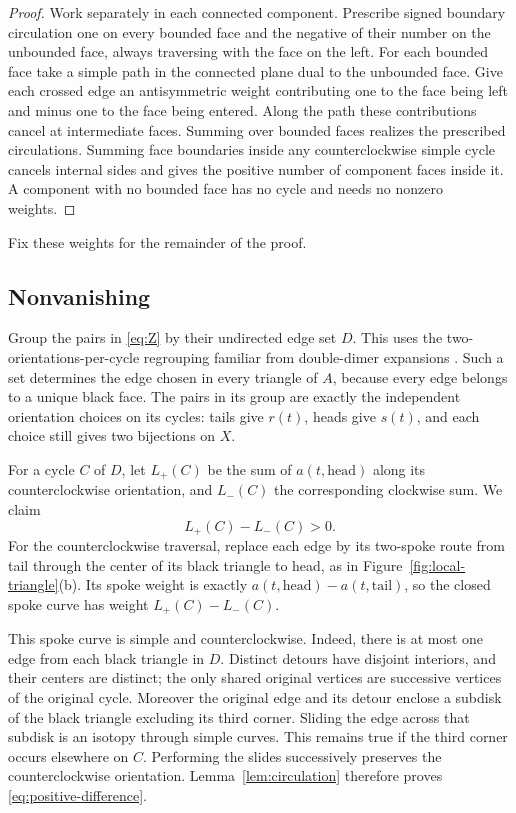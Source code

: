 \documentclass[11pt]{article}
\theoremstyle{remark}
\numberwithin{equation}{section}
\begin{document}
\begin{proof}
Work separately in each connected component. Prescribe
signed boundary circulation one on every bounded face and
the negative of their number on the unbounded face, always
traversing with the face on the left. For each bounded face
take a simple path in the connected plane dual to the
unbounded face. Give each crossed edge an antisymmetric
weight contributing one to the face being left and minus
one to the face being entered. Along the path these
contributions cancel at intermediate faces. Summing over
bounded faces realizes the prescribed circulations.
Summing face boundaries inside any counterclockwise simple
cycle cancels internal sides and gives the positive number
of component faces inside it. A component with no bounded
face has no cycle and needs no nonzero weights.
\end{proof}

Fix these weights for the remainder of the proof.

\subsection{Nonvanishing}

Group the pairs in \eqref{eq:Z} by their undirected edge
set \(D\). This uses the two-orientations-per-cycle regrouping
familiar from double-dimer expansions
\cite[Section~3.2.1, Lemma~1]{Kenyon2014}. Such a set determines the edge chosen in every
triangle of \(A\), because every edge belongs to a unique
black face. The pairs in its group are exactly the
independent orientation choices on its cycles: tails
give \(r(t)\), heads give \(s(t)\), and each choice
still gives two bijections on \(X\).

For a cycle \(C\) of \(D\), let \(L_+(C)\) be the sum
of \(a(t,\mathrm{head})\) along its counterclockwise
orientation, and \(L_-(C)\) the corresponding clockwise
sum. We claim
\begin{equation}\label{eq:positive-difference}
 L_+(C)-L_-(C)>0.
\end{equation}
For the counterclockwise traversal, replace each edge
by its two-spoke route from tail through the center of
its black triangle to head, as in Figure~\ref{fig:local-triangle}(b).
Its spoke weight is exactly
\(a(t,\mathrm{head})-a(t,\mathrm{tail})\), so the
closed spoke curve has weight \(L_+(C)-L_-(C)\).

This spoke curve is simple and counterclockwise. Indeed,
there is at most one edge from each black triangle in
\(D\). Distinct detours have disjoint interiors, and
their centers are distinct; the only shared original
vertices are successive vertices of the original cycle.
Moreover the original edge and its detour enclose a
subdisk of the black triangle excluding its third
corner. Sliding the edge across that subdisk is an
isotopy through simple curves. This remains true if
the third corner occurs elsewhere on \(C\). Performing
the slides successively preserves the counterclockwise
orientation. Lemma~\ref{lem:circulation} therefore proves
\eqref{eq:positive-difference}.
\end{document}
